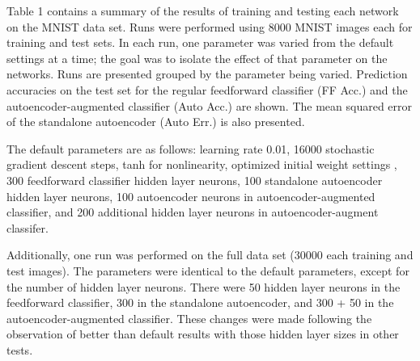 \documentclass[english]{tktltiki}
\begin{document}
Table 1 contains a summary of the results of training and testing each network on the MNIST data set.  Runs were performed using 8000 MNIST images each for training and test sets.  In each run, one parameter was varied from the default settings at a time; the goal was to isolate the effect of that parameter on the networks.  Runs are presented grouped by the parameter being varied.  Prediction accuracies on the test set for the regular feedforward classifier (FF Acc.) and the autoencoder-augmented classifier (Auto Acc.) are shown.  The mean squared error of the standalone autoencoder (Auto Err.) is also presented.  

The default parameters are as follows: learning rate 0.01, 16000 stochastic gradient descent steps, tanh for nonlinearity, optimized initial weight settings \cite{glorot2010understanding}, 300 feedforward classifier hidden layer neurons, 100 standalone autoencoder hidden layer neurons, 100 autoencoder neurons in autoencoder-augmented classifier, and 200 additional hidden layer neurons in autoencoder-augment classifer.

Additionally, one run was performed on the full data set (30000 each training and test images).  The parameters were identical to the default parameters, except for the number of hidden layer neurons.  There were 50 hidden layer neurons in the feedforward classifier, 300 in the standalone autoencoder, and 300 + 50 in the autoencoder-augmented classifier.  These changes were made following the observation of better than default results with those hidden layer sizes in other tests.
\end{document}
